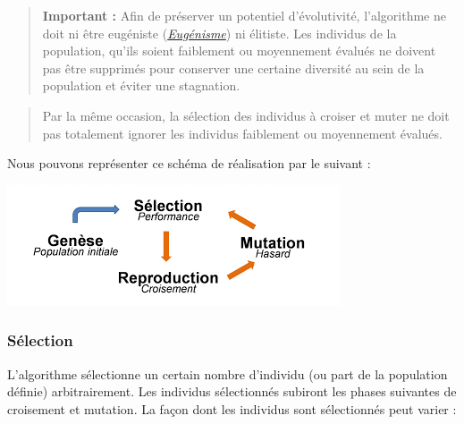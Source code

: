 \begin{quote}
\textbf{Important :} Afin de préserver un potentiel d'évolutivité,
l'algorithme ne doit ni être eugéniste
(\emph{\href{https://fr.wikipedia.org/wiki/Eug\%C3\%A9nisme}{Eugénisme}})
ni élitiste. Les individus de la population, qu'ils soient faiblement ou
moyennement évalués ne doivent pas être supprimés pour conserver une
certaine diversité au sein de la population et éviter une stagnation.
\end{quote}

\begin{quote}
Par la même occasion, la sélection des individus à croiser et muter ne
doit pas totalement ignorer les individus faiblement ou moyennement
évalués.
\end{quote}

Nous pouvons représenter ce schéma de réalisation par le suivant :

\includegraphics{.ressources/algo_gen_scheme.png}

\hypertarget{suxe9lection}{%
\subsubsection{Sélection}\label{suxe9lection}}

L'algorithme sélectionne un certain nombre d'individu (ou part de la
population définie) arbitrairement. Les individus sélectionnés subiront
les phases suivantes de croisement et mutation. La façon dont les
individus sont sélectionnés peut varier :

